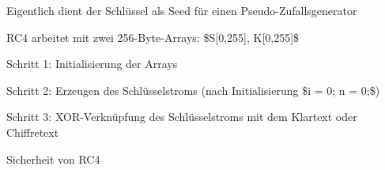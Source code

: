 \documentclass[a4paper]{article}
\begin{document}
\begin{multicols}{3}
\begin{itemize*}
            \begin{itemize*}
                  \item Eigentlich dient der Schlüssel als Seed für einen Pseudo-Zufallsgenerator
            \end{itemize*}
            \item
            RC4 arbeitet mit zwei 256-Byte-Arrays: \$S{[}0,255{]}, K{[}0,255{]}\$

            \begin{itemize*}
                  \item Schritt 1: Initialisierung der Arrays
                  \item Schritt 2: Erzeugen des Schlüsselstroms (nach Initialisierung \$i = 0; n = 0;\$)
                  \item Schritt 3: XOR-Verknüpfung des Schlüsselstroms mit dem Klartext oder Chiffretext
            \end{itemize*}
            \item
            Sicherheit von RC4


\end{itemize*}
\end{multicols}
\end{document}
